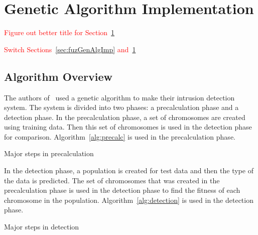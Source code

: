 \documentclass{sig-alternate}
\newcommand{\mycomment}[1]{\textcolor{red}{#1}}
\begin{document}
\section{Genetic Algorithm Implementation}
\label{sec:genAlgImp}
\mycomment{Figure out better title for Section~\ref{sec:genAlgImp}}

\mycomment{Switch Sections~\ref{sec:fuzGenAlgImp} and~\ref{sec:genAlgImp}}

\subsection{Algorithm Overview}
The authors of~\cite{DBLP:journals/corr/abs-1204-1336} used a genetic algorithm to make their intrusion detection system. The system is divided into two phases: a precalculation phase and a detection phase. In the precalculation phase, a set of chromosomes are created using training data. Then this set of chromosomes is used in the detection phase for comparison. Algorithm~\ref{alg:precalc} is used in the precalculation phase.

\begin{algorithm}
\caption{Major steps in precalculation}
\label{alg:precalc}
\begin{algorithmic}
  \ELSE {}
  \ENDIF
\ENDFOR
\end{algorithmic}
\end{algorithm}

In the detection phase, a population is created for test data and then the type of the data is predicted. The set of chromosomes that was created in the precalculation phase is used in the detection phase to find the fitness of each chromosome in the population. Algorithm~\ref{alg:detection} is used in the detection phase.

\begin{algorithm}
\caption{Major steps in detection}
\label{alg:detection}
\begin{algorithmic}
    \ENDFOR
  \ENDFOR
\ENDWHILE
\end{algorithmic}
\end{algorithm}
\end{document}
